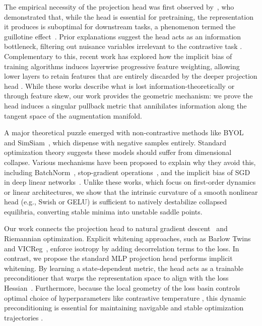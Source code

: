 \documentclass{article}
\theoremstyle{plain}
\theoremstyle{definition}
\theoremstyle{remark}
\begin{document}
The empirical necessity of the projection head was first observed by~\citet{chen2020simclr}, who demonstrated that, while the head is essential for pretraining, the representation it produces is suboptimal for downstream tasks, a phenomenon termed the guillotine effect~\citep{bordes2023guillotine}. Prior explanations suggest the head acts as an information bottleneck, filtering out nuisance variables irrelevant to the contrastive task \citep{jing2022understanding, ouyang2025projection}. Complementary to this, recent work has explored how the implicit bias of training algorithms induces layerwise progressive feature weighting, allowing lower layers to retain features that are entirely discarded by the deeper projection head \citep{xue2024projection}. While these works describe what is lost information-theoretically or through feature skew, our work provides the geometric mechanism: we prove the head induces a singular pullback metric that annihilates information along the tangent space of the augmentation manifold.

A major theoretical puzzle emerged with non-contrastive methods like BYOL~\citep{grill2020byol} and SimSiam~\citep{chen2021exploring}, which dispense with negative samples entirely. Standard optimization theory suggests these models should suffer from dimensional collapse. Various mechanisms have been proposed to explain why they avoid this, including BatchNorm~\citep{richemond2020byol}, stop-gradient operations~\citep{chen2021exploring}, and the implicit bias of SGD in deep linear networks~\citep{tian2021understanding, wen2023mechanism}. Unlike these works, which focus on first-order dynamics or linear architectures, we show that the intrinsic curvature of a smooth nonlinear head (e.g., Swish or GELU) is sufficient to natively destabilize collapsed equilibria, converting stable minima into unstable saddle points.

Our work connects the projection head to natural gradient descent~\citep{amari1998natural} and Riemannian optimization. Explicit whitening approaches, such as Barlow Twins~\citep{zbontar2021barlow} and VICReg~\citep{bardes2022vicreg}, enforce isotropy by adding decorrelation terms to the loss. In contrast, we propose the standard MLP projection head performs implicit whitening. By learning a state-dependent metric, the head acts as a trainable preconditioner that warps the representation space to align with the loss Hessian~\citep{yang2022tensor}. Furthermore, because the local geometry of the loss basin controls optimal choice of hyperparameters like contrastive temperature \citep{chaudhry2026asymptotic}, this dynamic preconditioning is essential for maintaining navigable and stable optimization trajectories \citep{chaudhry2026trajectoryrestricted}.
\end{document}
